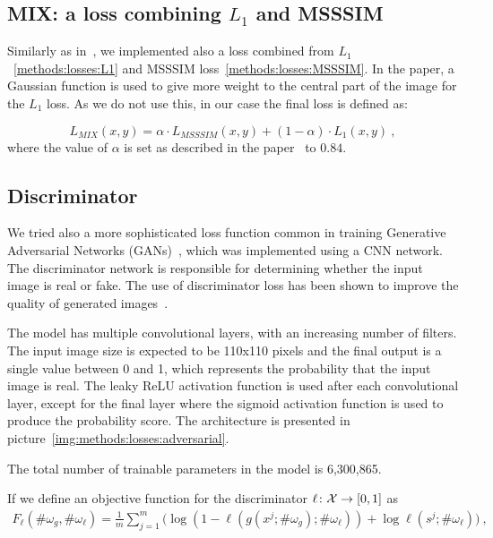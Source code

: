 \subsection{MIX: a loss combining $L_1$ and MSSSIM}
\label{methods:losses:MIX}
Similarly as in~\citep{zhao2016loss}, we implemented also a loss combined from $L_1$~\ref{methods:losses:L1} and MSSSIM loss~\ref{methods:losses:MSSSIM}. In the paper, a Gaussian function is used to give more weight to the central part of the image for the $L_1$ loss. As we do not use this, in our case the final loss is defined as:


\begin{equation}
L_{MIX}(x,y) = \alpha \cdot L_{MSSSIM}(x,y) + (1 - \alpha) \cdot L_1(x,y)\:,
\end{equation}
where the value of $\alpha$ is set as described in the paper~\citep{zhao2016loss} to $0.84$.


\subsection{Discriminator}
\label{methods:losses:adversarial}
We tried also a more sophisticated loss function common in training Generative Adversarial Networks (GANs)~\citep{goodfellow2014generative}, which was implemented using a CNN network. The discriminator network is responsible for determining whether the input image is real or fake. The use of discriminator loss has been shown to improve the quality of generated images~\citep{radford2015unsupervised, ledig2017photorealistic, wang2018highresolution}.

The model has multiple convolutional layers, with an increasing number of filters. The input image size is expected to be 110x110 pixels and the final output is a single value between 0 and 1, which represents the probability that the input image is real. The leaky ReLU activation function is used after each convolutional layer, except for the final layer where the sigmoid activation function is used to produce the probability score. The architecture is presented in picture~\ref{img:methods:losses:adversarial}.

The total number of trainable parameters in the model is 6,300,865.

If we define an objective function for the discriminator $\ell \colon {\cal X} \rightarrow [0,1]$ as
\begin{equation}
  \label{equ:generator_quality_2}
  \begin{array}{rl}
  F_\ell(\#\omega_g,\#\omega_\ell) = \displaystyle\frac{1}{m}\sum_{j=1}^m \big(\log (1 - \ell(g( x^j; \#\omega_g); \#\omega_\ell )) + \log \ell( s^j; \#\omega_\ell) \big) \:,
  \end{array}
\end{equation}

